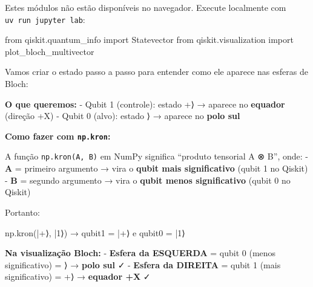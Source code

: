 \documentclass[
  brazilian,
]{report}
\newenvironment{Shaded}{\begin{snugshade}}{\end{snugshade}}
\newcommand{\DecValTok}[1]{\textcolor[rgb]{0.68,0.00,0.00}{#1}}
\newcommand{\ImportTok}[1]{\textcolor[rgb]{0.00,0.46,0.62}{#1}}
\newcommand{\NormalTok}[1]{\textcolor[rgb]{0.00,0.23,0.31}{#1}}
\newcommand{\OperatorTok}[1]{\textcolor[rgb]{0.37,0.37,0.37}{#1}}
\begin{document}
\begin{tcolorbox}[enhanced jigsaw, arc=.35mm, bottomrule=.15mm, bottomtitle=1mm, breakable, colback=white, colbacktitle=quarto-callout-note-color!10!white, colframe=quarto-callout-note-color-frame, coltitle=black, left=2mm, leftrule=.75mm, opacityback=0, opacitybacktitle=0.6, rightrule=.15mm, title=\textcolor{quarto-callout-note-color}{\faInfo}\hspace{0.5em}{🔒 Imports do Qiskit (requerem execução local)}, titlerule=0mm, toprule=.15mm, toptitle=1mm]

Estes módulos não estão disponíveis no navegador. Execute localmente com
\texttt{uv\ run\ jupyter\ lab}:

\begin{Shaded}
\begin{Highlighting}[]
\ImportTok{from}\NormalTok{ qiskit.quantum\_info }\ImportTok{import}\NormalTok{ Statevector}
\ImportTok{from}\NormalTok{ qiskit.visualization }\ImportTok{import}\NormalTok{ plot\_bloch\_multivector}
\end{Highlighting}
\end{Shaded}

\end{tcolorbox}

Vamos criar o estado passo a passo para entender como ele aparece nas
esferas de Bloch:

\textbf{O que queremos:} - Qubit 1 (controle): estado \textbar+⟩ →
aparece no \textbf{equador} (direção +X) - Qubit 0 (alvo): estado
⟩ → aparece no \textbf{polo sul}

\textbf{Como fazer com \texttt{np.kron}:}

A função \texttt{np.kron(A,\ B)} em NumPy significa ``produto tensorial
A ⊗ B'', onde: - \textbf{A} = primeiro argumento → vira o \textbf{qubit
mais significativo} (qubit 1 no Qiskit) - \textbf{B} = segundo argumento
→ vira o \textbf{qubit menos significativo} (qubit 0 no Qiskit)

Portanto:

\begin{Shaded}
\begin{Highlighting}[]
\NormalTok{np.kron(}\OperatorTok{|+}\NormalTok{⟩, }\OperatorTok{|}\DecValTok{1}\NormalTok{⟩)  →  qubit1 }\OperatorTok{=} \OperatorTok{|+}\NormalTok{⟩  e  qubit0 }\OperatorTok{=} \OperatorTok{|}\DecValTok{1}\NormalTok{⟩}
\end{Highlighting}
\end{Shaded}

\textbf{Na visualização Bloch:} - \textbf{Esfera da ESQUERDA} = qubit 0
(menos significativo) = ⟩ → \textbf{polo sul} ✓ -
\textbf{Esfera da DIREITA} = qubit 1 (mais significativo) = \textbar+⟩ →
\textbf{equador +X} ✓
\end{document}

